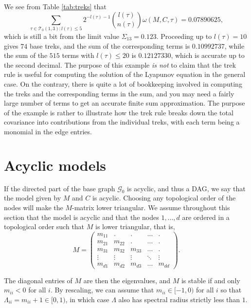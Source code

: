 \documentclass[10pt,twoside,a4paper]{amsart}
\begin{document}
\begin{ex}
We see from Table \ref{tab:treks} that 
\[
    \sum_{\tau \in \mathcal{T}_0(1,3): l(\tau) \leq 5} 
    2^{-l(\tau) - 1} {l(\tau) \choose n(\tau)} \omega(M, C, \tau) 
    = 0.07890625,
\]
which is still a bit from the limit value $\Sigma_{13} = 0.123$. Proceeding up
to $l(\tau) = 10$ gives $74$ base treks, and the sum of the corresponding terms
is $0.10992737$, while the sum of the $515$ terms with $l(\tau) \leq 20$ is
$0.12127330$, which is accurate up to the second decimal. The purpose of this
example \emph{is not} to claim that the trek rule is useful for computing the
solution of the Lyapunov equation in the general case. On the contrary, there is
quite a lot of bookkeeping involved in computing the treks and the corresponding
terms in the sum, and you may need a fairly large number of terms to get an
accurate finite sum approximation. The purpose of the example is rather to
illustrate how the trek rule breaks down the total covariance into contributions
from the individual treks, with each term being a monomial in the edge
entries.
\end{ex}

\section{Acyclic models} \label{sec:acyclic}

If the directed part of the base graph $\mathcal{G}_0$ is acyclic, 
and thus a DAG, we say that the model given by $M$ and $C$ is acyclic. Choosing any 
topological order of the nodes will make the $M$-matrix lower triangular.
We assume throughout this section that the model is acyclic and that 
the nodes $1, \ldots, d$ are ordered in a topological order such that
$M$ is lower triangular, that is,
\[
    M = \left( \begin{array}{cccccc} 
        m_{11} & . & . & \ldots & . \\
        m_{21} & m_{22} & . & \ldots & . \\
        m_{31} & m_{32} & m_{33} & \ldots  & . \\
        \vdots & \vdots & \vdots & \ddots  & \vdots \\
        m_{d1} & m_{d2} & m_{d3} & \ldots &  m_{dd}        
    \end{array}\right). 
\]

The diagonal entries of $M$ are then the eigenvalues, and $M$ is stable 
if and only $m_{ii} < 0$ for all $i$. By rescaling, we can assume that
$m_{ii} \in [-1, 0)$ for all $i$ so that $\Lambda_{ii} = m_{ii} + 1 \in [0, 1)$,
in which case $\Lambda$ also has spectral radius strictly less than $1$.
\end{document}
